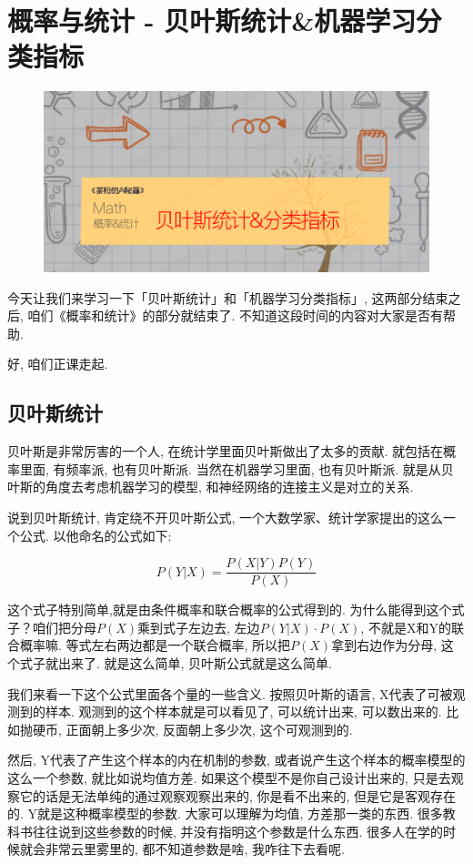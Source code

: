 \chapter{概率与统计 - 贝叶斯统计\&机器学习分类指标}
\begin{figure}[ht]
  \centering
  \includegraphics[width=1\linewidth]{asset/茶桁的AI秘籍_Math_22.png}
\end{figure}
\newpage


今天让我们来学习一下「贝叶斯统计」和「机器学习分类指标」, 这两部分结束之后, 咱们《概率和统计》的部分就结束了. 不知道这段时间的内容对大家是否有帮助. 

好, 咱们正课走起. 

\section{贝叶斯统计}

贝叶斯是非常厉害的一个人, 在统计学里面贝叶斯做出了太多的贡献. 就包括在概率里面, 有频率派, 也有贝叶斯派. 当然在机器学习里面, 也有贝叶斯派. 就是从贝叶斯的角度去考虑机器学习的模型, 和神经网络的连接主义是对立的关系. 

说到贝叶斯统计, 肯定绕不开贝叶斯公式, 一个大数学家、统计学家提出的这么一个公式. 以他命名的公式如下: 

\[P(Y|X) = \frac{P(X|Y)P(Y)}{P(X)}\]

这个式子特别简单,就是由条件概率和联合概率的公式得到的. 为什么能得到这个式子？咱们把分母$P(X)$乘到式子左边去, 左边$P(Y|X) \cdot P(X)$, 不就是X和Y的联合概率嘛. 等式左右两边都是一个联合概率, 所以把$P(X)$拿到右边作为分母, 这个式子就出来了. 就是这么简单, 贝叶斯公式就是这么简单. 

我们来看一下这个公式里面各个量的一些含义. 按照贝叶斯的语言, X代表了可被观测到的样本. 观测到的这个样本就是可以看见了, 可以统计出来, 可以数出来的. 比如抛硬币, 正面朝上多少次, 反面朝上多少次, 这个可观测到的. 

然后, Y代表了产生这个样本的内在机制的参数, 或者说产生这个样本的概率模型的这么一个参数, 就比如说均值方差. 如果这个模型不是你自己设计出来的, 只是去观察它的话是无法单纯的通过观察观察出来的, 你是看不出来的, 但是它是客观存在的. Y就是这种概率模型的参数. 大家可以理解为均值, 方差那一类的东西. 很多教科书往往说到这些参数的时候, 并没有指明这个参数是什么东西. 很多人在学的时候就会非常云里雾里的, 都不知道参数是啥, 我咋往下去看呢. 

